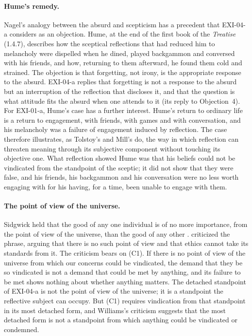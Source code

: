 \paragraph{Hume's remedy.} Nagel's analogy between the absurd and scepticism has a precedent that EXI-04-a considers as an objection. Hume, at the end of the first book of the \emph{Treatise} (1.4.7), describes how the sceptical reflections that had reduced him to melancholy were dispelled when he dined, played backgammon and conversed with his friends, and how, returning to them afterward, he found them cold and strained. The objection is that forgetting, not irony, is the appropriate response to the absurd. EXI-04-a replies that forgetting is not a response to the absurd but an interruption of the reflection that discloses it, and that the question is what attitude fits the absurd when one attends to it (its reply to Objection~4). For EXI-01-a, Hume's case has a further interest. Hume's return to ordinary life is a return to engagement, with friends, with games and with conversation, and his melancholy was a failure of engagement induced by reflection. The case therefore illustrates, as Tolstoy's and Mill's do, the way in which reflection can threaten meaning through its subjective component without touching its objective one. What reflection showed Hume was that his beliefs could not be vindicated from the standpoint of the sceptic; it did not show that they were false, and his friends, his backgammon and his conversation were no less worth engaging with for his having, for a time, been unable to engage with them.

\paragraph{The point of view of the universe.} Sidgwick held that the good of any one individual is of no more importance, from the point of view of the universe, than the good of any other \citep[III.xiii]{Sidgwick1907}. \citet{Williams1982} criticized the phrase, arguing that there is no such point of view and that ethics cannot take its standards from it. The criticism bears on (C1). If there is no point of view of the universe from which our concerns could be vindicated, the demand that they be so vindicated is not a demand that could be met by anything, and its failure to be met shows nothing about whether anything matters. The detached standpoint of EXI-04-a is not the point of view of the universe; it is a standpoint the reflective subject can occupy. But (C1) requires vindication from that standpoint in its most detached form, and Williams's criticism suggests that the most detached form is not a standpoint from which anything could be vindicated or condemned.

